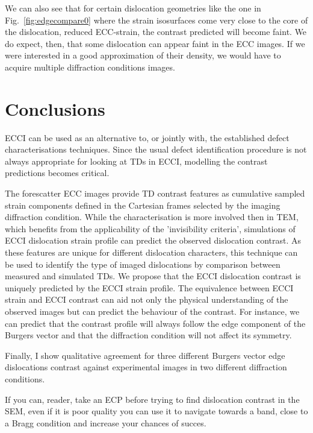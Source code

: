 We can also see that for certain dislocation geometries like the one in Fig.~\ref{fig:edgecompare0} where the strain isosurfaces come very close to the core of the dislocation, \ie reduced ECC-strain, the contrast predicted will become faint. We do expect, then, that some dislocation can appear faint in the ECC images. If we were interested in a good approximation of their density, we would have to acquire multiple diffraction conditions images. 

\pagebreak

\section{Conclusions}
ECCI can be used as an alternative to, or jointly with, the established defect characterisations techniques. Since the usual defect identification procedure is not always appropriate for looking at TDs in ECCI, modelling the contrast predictions becomes critical. 

The forescatter ECC images provide TD contrast features as cumulative sampled strain components defined in the Cartesian frames selected by the imaging diffraction condition. While the characterisation is more involved then in TEM, which benefits from the applicability of the 'invisibility criteria', simulations of ECCI dislocation strain profile can predict the observed dislocation contrast. As these features are unique for different dislocation characters, this technique can be used to identify the type of imaged dislocations by comparison between measured and simulated TDs. We propose that the ECCI dislocation contrast is uniquely predicted by the ECCI strain profile. The equivalence between ECCI strain and ECCI contrast can aid not only the physical understanding of the observed images but can predict the behaviour of the contrast. For instance, we can predict that the contrast profile will always follow the edge component of the Burgers vector and that the diffraction condition will not affect its symmetry.


Finally, I show qualitative agreement for three different Burgers vector edge dislocations contrast against experimental images in two different diffraction conditions. 

If you can, reader, take an ECP before trying to find dislocation contrast in the SEM, even if it is poor quality you can use it to navigate towards a band, close to a Bragg condition and increase your chances of succes. 



      
